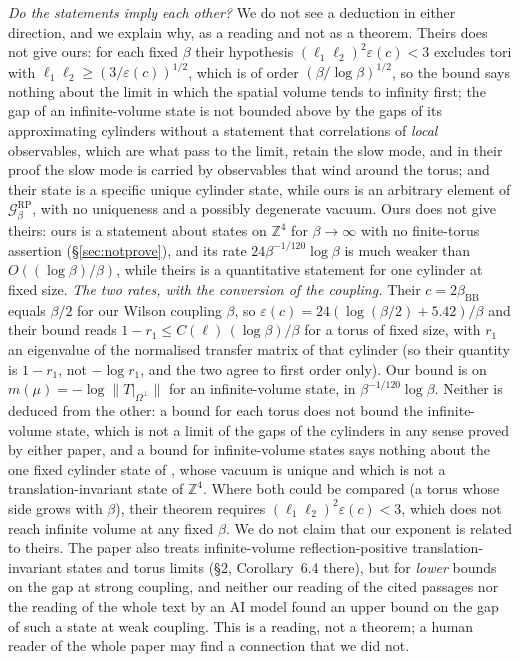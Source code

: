 \documentclass[11pt,a4paper]{article}
\theoremstyle{plain}
\theoremstyle{definition}
\theoremstyle{remark}
\numberwithin{equation}{section}
\newcommand{\Z}{\mathbb{Z}}
\newcommand{\cG}{\mathcal{G}}
\begin{document}
\emph{Do the statements imply each other?} We do not see a deduction in either direction, and we explain why, as a reading and not as a theorem.
Theirs does not give ours: for each fixed $\beta$ their hypothesis $(\ell_1\ell_2)^2\varepsilon(c)<3$ excludes tori with $\ell_1\ell_2\ge(3/\varepsilon(c))^{1/2}$, which is of order $(\beta/\log\beta)^{1/2}$, so the bound says nothing about the limit
in which the spatial volume tends to infinity first; the gap of an infinite-volume state is not bounded above by the gaps of its approximating cylinders without a statement that
correlations of \emph{local} observables, which are what pass to the limit, retain the slow mode, and in their proof the slow mode is carried by observables that wind around the torus;
and their state is a specific unique cylinder state, while ours is an arbitrary element of $\cG^{\mathrm{RP}}_\beta$, with no uniqueness and a possibly degenerate vacuum.
Ours does not give theirs: ours is a statement about states on $\Z^4$ for $\beta\to\infty$ with no finite-torus assertion
(\S\ref{sec:notprove}), and its rate $24\beta^{-1/120}\log\beta$ is much weaker than $O((\log\beta)/\beta)$, while theirs is a quantitative statement for one cylinder at fixed size.
\emph{The two rates, with the conversion of the coupling.} Their $c=2\beta_{\mathrm{BB}}$ equals $\beta/2$ for our Wilson coupling $\beta$, so
$\varepsilon(c)=24(\log(\beta/2)+5.42)/\beta$ and their bound reads $1-r_1\le C(\ell)\,(\log\beta)/\beta$ for a torus of fixed size, with
$r_1$ an eigenvalue of the normalised transfer matrix of that cylinder (so their quantity is $1-r_1$, not $-\log r_1$, and the two agree to first order only). Our
bound is on $m(\mu)=-\log\|T|_{\Omega^\perp}\|$ for an infinite-volume state, in $\beta^{-1/120}\log\beta$. Neither is deduced from the other:
a bound for each torus does not bound the infinite-volume state, which is not a limit of the gaps of the cylinders in any sense proved by either paper,
and a bound for infinite-volume states says nothing about the one fixed cylinder state of \cite{BB26}, whose vacuum is unique and which is not a translation-invariant state of $\Z^4$.
Where both could be compared (a torus whose side grows with $\beta$), their theorem requires $(\ell_1\ell_2)^2\varepsilon(c)<3$, which does not reach infinite volume at any fixed $\beta$.
We do not claim that our exponent is related to theirs.
The paper \cite{BB26} also treats infinite-volume reflection-positive translation-invariant states and torus limits (\S2, Corollary~6.4 there), but for \emph{lower} bounds on the gap at strong coupling, and
neither our reading of the cited passages nor the reading of the whole text by an AI model found an upper bound on the gap of such a state at weak coupling.
This is a reading, not a theorem; a human reader of the whole paper may find a connection that we did not.
\end{document}
